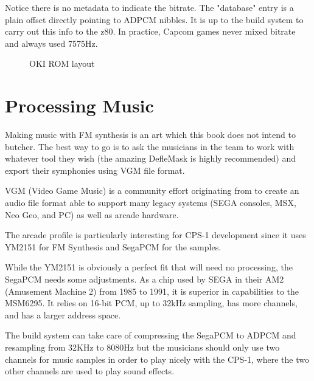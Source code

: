 

Notice there is no metadata to indicate the bitrate. The "database" entry is a plain offset directly pointing to ADPCM nibbles. It is up to the build system to carry out this info to the z80. In practice, Capcom games never mixed bitrate and always used 7575Hz.

\begin{figure}[H]
\caption*{OKI ROM layout\cite{MSM6295_datasheet}}
\end{figure}















\section{Processing Music}
Making music with FM synthesis is an art which this book does not intend to butcher. The best way to go is to ask the musicians in the team to work with whatever tool they wish (the amazing DefleMask is highly recommended) and export their symphonies using VGM file format.

VGM (Video Game Music) is a community effort originating from  to create an audio file format able to support many legacy systems (SEGA consoles, MSX, Neo Geo, and PC) as well as arcade hardware.

The arcade profile is particularly interesting for CPS-1 development since it uses YM2151 for FM Synthesis and SegaPCM for the samples.

While the YM2151 is obviously a perfect fit that will need no processing, the SegaPCM needs some adjustments. As a chip used by SEGA in their AM2 (Amusement Machine 2) from 1985 to 1991, it is superior in capabilities to the MSM6295. It relies on 16-bit PCM, up to 32kHz sampling, has more channels, and has a larger address space.

The build system can take care of compressing the SegaPCM to ADPCM and resampling from 32KHz to 8080Hz but the musicians should only use two channels for music samples in order to play nicely with the CPS-1, where the two other channels are used to play sound effects.






